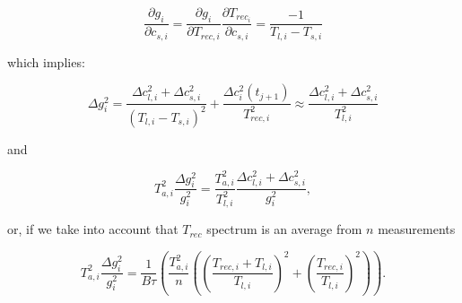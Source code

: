 \begin{equation}
 \frac{\partial g_{i}}{\partial c_{s,i}} = \frac{\partial g_{i}}{\partial T_{rec,i}}\frac{\partial T_{rec_{i}}}{\partial c_{s,i}} =
\frac{-1}{T_{l,i}-T_{s,i}} 
\end{equation}

which implies:

\begin{equation}
\Delta g_{i}^{2} =  \frac{\Delta c_{l,i}^{2} + \Delta c_{s,i}^{2}}{(T_{l,i}-T_{s,i})^2} + \frac{ \Delta c_{i}^{2}(t_{j+1})}{T_{rec,i}^{2}}
\approx \frac{\Delta c_{l,i}^{2} + \Delta c_{s,i}^{2}}{T_{l,i}^2}
\end{equation}
 
and

\begin{equation}
T_{a,i}^{2}\frac{\Delta g_{i}^{2}}{g_{i}^2} = \frac{T_{a,i}^{2}}{T_{l,i}^2} \frac{\Delta c_{l,i}^{2} + \Delta c_{s,i}^{2}}{g_{i}^{2}},
\end{equation}

or, if we take into account that \(T_{rec}\) spectrum is an average from \(n\) measurements

\begin{equation}
 T_{a,i}^{2}\frac{\Delta g_{i}^{2}}{g_{i}^2} =  \frac{1}{B\tau} \left(
   \frac{T_{a,i}^{2}}{n} \left( \left( \frac{T_{rec,i} + T_{l,i}}{T_{l,i}} \right)^2 + \left( \frac{T_{rec,i} }{T_{l,i}} \right)^2 \right) \right).
\end{equation}





